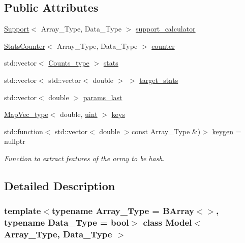 \subsection*{Public Attributes}
\begin{DoxyCompactItemize}
\item 
\hyperlink{class_support}{Support}$<$ Array\+\_\+\+Type, Data\+\_\+\+Type $>$ \hyperlink{class_model_a0bbd3396f6ab0c19cee3f6825ba98b6e}{support\+\_\+calculator}
\item 
\hyperlink{class_stats_counter}{Stats\+Counter}$<$ Array\+\_\+\+Type, Data\+\_\+\+Type $>$ \hyperlink{class_model_a5af3db8f0635a1aa59519ab94bfd7ebb}{counter}
\item 
std\+::vector$<$ \hyperlink{typedefs_8hpp_aee40fa17c1fddb63dd1f2b1470ade95b}{Counts\+\_\+type} $>$ \hyperlink{class_model_a1816b0dd69226394643dc31916c8645e}{stats}
\item 
std\+::vector$<$ std\+::vector$<$ double $>$ $>$ \hyperlink{class_model_ab0f4642a2d4602fabb6774914b7dbd39}{target\+\_\+stats}
\item 
std\+::vector$<$ double $>$ \hyperlink{class_model_aabe906408c76bb1d793720caddfb8bea}{params\+\_\+last}
\item 
\hyperlink{typedefs_8hpp_a02ed8dec96bc528c8bc3d8cb3c4674a5}{Map\+Vec\+\_\+type}$<$ double, \hyperlink{typedefs_8hpp_a91ad9478d81a7aaf2593e8d9c3d06a14}{uint} $>$ \hyperlink{class_model_a706e07b974a8d16cbdb363517d756f41}{keys}
\item 
std\+::function$<$ std\+::vector$<$ double $>$const Array\+\_\+\+Type \&)$>$ \hyperlink{class_model_a087db7c5e2ee47f4353d2e181223dd5a}{keygen} = nullptr
\begin{DoxyCompactList}\small\item\em Function to extract features of the array to be hash. \end{DoxyCompactList}\end{DoxyCompactItemize}


\subsection{Detailed Description}
\subsubsection*{template$<$typename Array\+\_\+\+Type = B\+Array$<$$>$, typename Data\+\_\+\+Type = bool$>$\newline
class Model$<$ Array\+\_\+\+Type, Data\+\_\+\+Type $>$}

